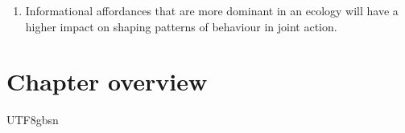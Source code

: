 \begin{CJK}{UTF8}{gbsn}
\begin{enumerate}
  \item Informational affordances that are more dominant in an ecology will have a higher impact on shaping patterns of behaviour in joint action.

\end{enumerate}





\section{Chapter overview}


                                              \end{CJK}{UTF8}{gbsn}
